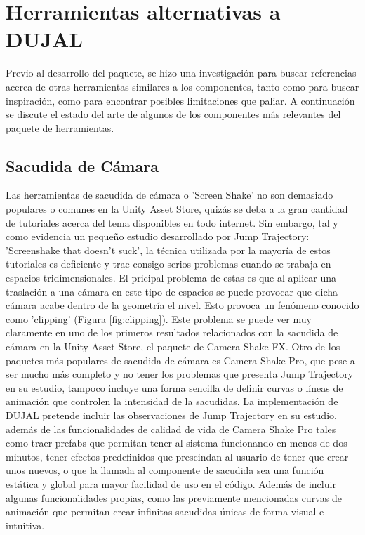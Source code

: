 \section{Herramientas alternativas a DUJAL}
Previo al desarrollo del paquete, se hizo una investigación para buscar referencias acerca de otras herramientas similares a los componentes,
 tanto como para buscar inspiración, como para encontrar posibles limitaciones que paliar. A continuación se discute el estado del arte de algunos de los componentes más relevantes del paquete de herramientas.

\subsection{Sacudida de Cámara}
Las herramientas de sacudida de cámara o 'Screen Shake' no son demasiado populares o comunes en la Unity Asset Store\cite{unityAssetStore}, quizás se deba a la gran cantidad de tutoriales acerca del tema disponibles en 
todo internet. Sin embargo, tal y como evidencia un pequeño estudio desarrollado por Jump Trajectory: 'Screenshake that doesn’t suck'\cite{Screenshake}, la técnica utilizada por la mayoría de estos tutoriales es deficiente
y trae consigo serios problemas cuando se trabaja en espacios tridimensionales. El pricipal problema de estas es que al aplicar una traslación a una cámara en este tipo de espacios se puede provocar que dicha cámara acabe dentro 
de la geometría el nivel. Esto provoca un fenómeno conocido como 'clipping' (Figura \ref{fig:clipping}). Este problema se puede ver muy claramente en uno de los primeros resultados relacionados con la sacudida de cámara en la Unity Asset 
Store\cite{unityAssetStore}, el paquete de Camera Shake FX\cite{ShakeFX}. Otro de los paquetes más populares de sacudida de cámara es Camera Shake Pro\cite{ShakePro}, que pese a ser mucho más completo y no tener los problemas 
que presenta Jump Trajectory en su estudio, tampoco incluye una forma sencilla de definir curvas o líneas de animación que controlen la intensidad de la sacudidas. La implementación de DUJAL pretende incluir las observaciones 
de Jump Trajectory en su estudio, además de las funcionalidades de calidad de vida de Camera Shake Pro\cite{ShakePro} tales como traer prefabs que permitan tener al sistema funcionando en menos de dos minutos, tener 
efectos predefinidos que prescindan al usuario de tener que crear unos nuevos, o que la llamada al componente de sacudida sea una función estática y global para mayor facilidad de uso en el código. Además de incluir algunas
funcionalidades propias, como las previamente mencionadas curvas de animación que permitan crear infinitas sacudidas únicas de forma visual e intuitiva.

